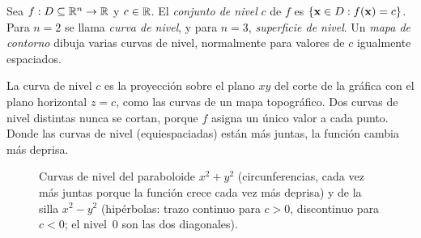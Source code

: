 \begin{definicion}\label{def:nivel}
Sea $f:D\subseteq\mathbb{R}^n\to\mathbb{R}$ y $c\in\mathbb{R}$. El \emph{conjunto de nivel} $c$ de $f$ es $\{\mathbf{x}\in D: f(\mathbf{x})=c\}$. Para $n=2$ se llama \emph{curva de nivel}, y para $n=3$, \emph{superficie de nivel}. Un \emph{mapa de contorno} dibuja varias curvas de nivel, normalmente para valores de $c$ igualmente espaciados.
\end{definicion}

La curva de nivel $c$ es la proyección sobre el plano $xy$ del corte de la gráfica con el plano horizontal $z=c$, como las curvas de un mapa topográfico. Dos curvas de nivel distintas nunca se cortan, porque $f$ asigna un único valor a cada punto. Donde las curvas de nivel (equiespaciadas) están más juntas, la función cambia más deprisa.

\begin{figure}[ht]
\centering
{}
\caption{Curvas de nivel del paraboloide $x^2+y^2$ (circunferencias, cada vez más juntas porque la función crece cada vez más deprisa) y de la silla $x^2-y^2$ (hipérbolas: trazo continuo para $c>0$, discontinuo para $c<0$; el nivel~$0$ son las dos diagonales).}
\label{fig:t3-niveles}
\end{figure}

